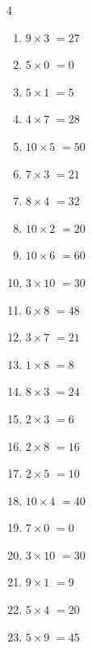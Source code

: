 \begin{multicols}{4}
\begin{enumerate}
  \item $9\times 3$
        $=27$

  \item $5\times 0$
        $=0$

  \item $5\times 1$
        $=5$

  \item $4\times 7$
        $=28$

  \item $10\times 5$
        $=50$

  \item $7\times 3$
        $=21$

  \item $8\times 4$
        $=32$

  \item $10\times 2$
        $=20$

  \item $10\times 6$
        $=60$

  \item $3\times 10$
        $=30$

  \item $6\times 8$
        $=48$

  \item $3\times 7$
        $=21$

  \item $1\times 8$
        $=8$

  \item $8\times 3$
        $=24$

  \item $2\times 3$
        $=6$

\columnbreak %

  \item $2\times 8$
        $=16$

  \item $2\times 5$
        $=10$

  \item $10\times 4$
        $=40$

  \item $7\times 0$
        $=0$

  \item $3\times 10$
        $=30$

  \item $9\times 1$
        $=9$

  \item $5\times 4$
        $=20$

  \item $5\times 9$
        $=45$


\end{enumerate}
\end{multicols}
